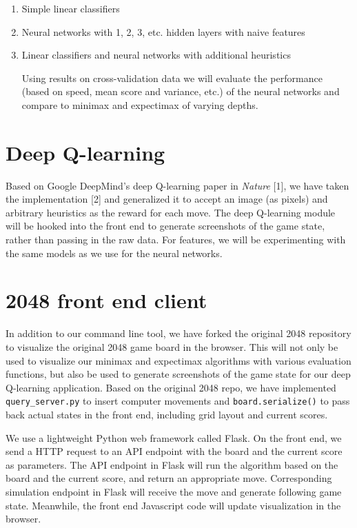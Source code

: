 \documentclass[11pt]{article}
\begin{document}
\begin{enumerate}[1)]

\item Simple linear classifiers

\item Neural networks with 1, 2, 3, etc. hidden layers with naive features

\item Linear classifiers and neural networks with additional heuristics

Using results on cross-validation data we will evaluate the performance (based on speed, mean score and variance, etc.) of the neural networks and compare to minimax and expectimax of varying depths.

\end{enumerate}

\section{Deep Q-learning}

Based on Google DeepMind’s deep Q-learning paper in \emph{Nature} [1], we have taken the implementation [2] and generalized it to accept an image (as pixels) and arbitrary heuristics as the reward for each move. The deep Q-learning module will be hooked into the front end to generate screenshots of the game state, rather than passing in the raw data. For features, we will be experimenting with the same models as we use for the neural networks. 

\section{2048 front end client}

In addition to our command line tool, we have forked the original 2048 repository to visualize the original 2048 game board in the browser. This will not only be used to visualize our minimax and expectimax algorithms with various evaluation functions, but also be used to generate screenshots of the game state for our deep Q-learning application. Based on the original 2048 repo, we have implemented \texttt{query\_server.py} to insert computer movements and \texttt{board.serialize()} to pass back actual states in the front end, including grid layout and current scores.

We use a lightweight Python web framework called Flask. On the front end, we send a HTTP request to an API endpoint with the board and the current score as parameters. The API endpoint in Flask will run the algorithm based on the board and the current score, and return an appropriate move. Corresponding simulation endpoint in Flask will receive the move and generate following game state. Meanwhile, the front end Javascript code will update visualization in the browser. 
\end{document}
